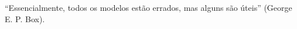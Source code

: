 ``Essencialmente, todos os modelos estão errados, mas alguns são úteis'' (George E. P. Box).\nocite{boxDraper1987}
